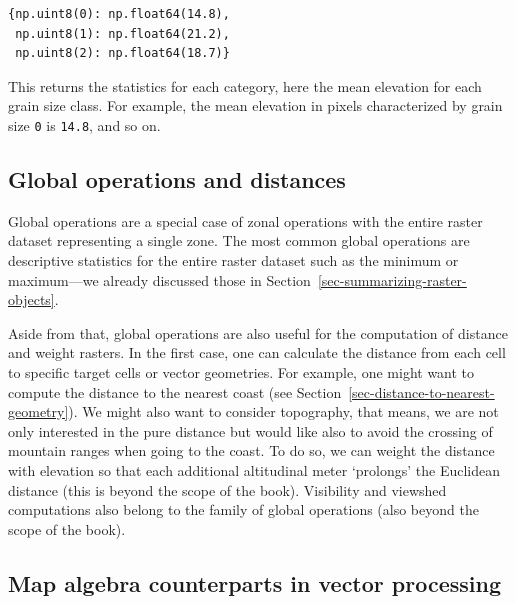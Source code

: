 \documentclass[
  letterpaper,
]{krantz}
\begin{document}
\begin{verbatim}
{np.uint8(0): np.float64(14.8),
 np.uint8(1): np.float64(21.2),
 np.uint8(2): np.float64(18.7)}
\end{verbatim}

This returns the statistics for each category, here the mean elevation
for each grain size class. For example, the mean elevation in pixels
characterized by grain size \texttt{0} is \texttt{14.8}, and so on.

\subsection{Global operations and
distances}\label{sec-global-operations-and-distances}

Global operations are a special case of zonal operations with the entire
raster dataset representing a single zone. The most common global
operations are descriptive statistics for the entire raster dataset such
as the minimum or maximum---we already discussed those in
Section~\ref{sec-summarizing-raster-objects}.

Aside from that, global operations are also useful for the computation
of distance and weight rasters. In the first case, one can calculate the
distance from each cell to specific target cells or vector geometries.
For example, one might want to compute the distance to the nearest coast
(see Section~\ref{sec-distance-to-nearest-geometry}). We might also want
to consider topography, that means, we are not only interested in the
pure distance but would like also to avoid the crossing of mountain
ranges when going to the coast. To do so, we can weight the distance
with elevation so that each additional altitudinal meter `prolongs' the
Euclidean distance (this is beyond the scope of the book). Visibility
and viewshed computations also belong to the family of global operations
(also beyond the scope of the book).

\subsection{Map algebra counterparts in vector
processing}\label{map-algebra-counterparts-in-vector-processing}
\end{document}
